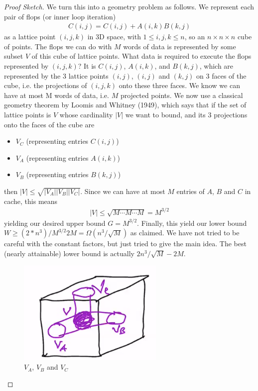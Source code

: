 \documentclass[11pt]{article}
\numberwithin{equation}{section}
\begin{document}
\begin{proof}[Proof Sketch]
    We turn this into a geometry problem as follows. We represent each pair of flops (or inner loop iteration) \begin{align*}
        C(i,j) = C(i,j) + A(i,k)B(k,j)
    \end{align*}
    as a lattice point $(i,j,k)$ in 3D space, with $1 \leq i,j,k \leq n$, so an $n \times n \times n$ cube of points. 
    The flops we can do with $M$ words of data is represented by some subset $V$ of this cube of lattice points.
    What data is required to execute the flops represented by $(i,j,k)$? It is $C(i,j)$, $A(i,k)$, and $B(k,j)$, 
    which are represented by the 3 lattice points $(i,j)$, $(i,j)$ and $(k,j)$ on 3 faces of the cube, i.e. the projections of $(i,j,k)$ onto these three faces.
    We know we can have at most M words of data, i.e. $M$ projected points. We now use a classical geometry theorem by Loomis and Whitney (1949),
    which says that if the set of lattice points is $V$ whose cardinality $|V|$ we want to bound, and its 3 projections onto the faces of the cube are \begin{itemize}
        \item $V_C$ (representing entries $C(i,j)$)
        \item $V_A$ (representing entries $A(i,k)$)
        \item $V_B$ (representing entries $B(k,j)$)
    \end{itemize}
    then $|V| \leq \sqrt{|V_A| |V_B| |V_C| }$. Since we can have at most $M$ entries of $A$, $B$ and $C$ in cache, this means \begin{align*}
        |V| \leq \sqrt{M \cdots M \cdots M} = M^{3/2}
    \end{align*}
    yielding our desired upper bound $G = M^{3/2}$. Finally, this yield our lower bound $W \geq (2*n^3)/M^{3/2} 2M = \Omega(n^3/\sqrt{M})$ as claimed.
    We have not tried to be careful with the constant factors, but just tried to give the main idea. The best (nearly attainable) lower bound is actually $2 n^3/\sqrt{M} - 2M$.
    \begin{figure}[h]
        \centering
        \includegraphics[width=7cm]{images/lec4-6.png}
        \caption{$V_A$, $V_B$ and $V_C$}
    \end{figure}
\end{proof}
\end{document}
